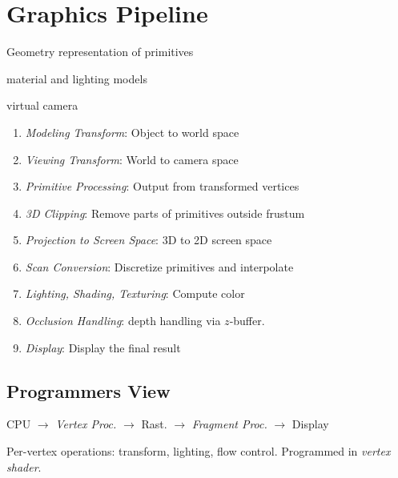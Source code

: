 \section{Graphics Pipeline}

\begin{definition}[Input]
  \begin{itemize*}
    \item Geometry representation of primitives
    \item material and lighting models
    \item virtual camera
  \end{itemize*}
\end{definition}

\begin{definition}
  \begin{enumerate}
    \item \textit{Modeling Transform}: Object to world space
    \item \textit{Viewing Transform}: World to camera space
    \item \textit{Primitive Processing}: Output from transformed vertices
    \item \textit{3D Clipping}: Remove parts of primitives outside frustum
    \item \textit{Projection to Screen Space}: 3D to 2D screen space
    \item \textit{Scan Conversion}: Discretize primitives and interpolate
    \item \textit{Lighting, Shading, Texturing}: Compute color
    \item \textit{Occlusion Handling}: depth handling via \(z\)-buffer.
    \item \textit{Display}: Display the final result
  \end{enumerate}
\end{definition}

\subsection{Programmers View}

\begin{center}
  CPU \(\to\) \textit{Vertex Proc.} \(\to\) Rast. \(\to\) \textit{Fragment Proc.} \(\to\) Display
\end{center}

\begin{definition}
  Per-vertex operations: transform, lighting, flow control. Programmed in \textit{vertex shader}.
\end{definition}

